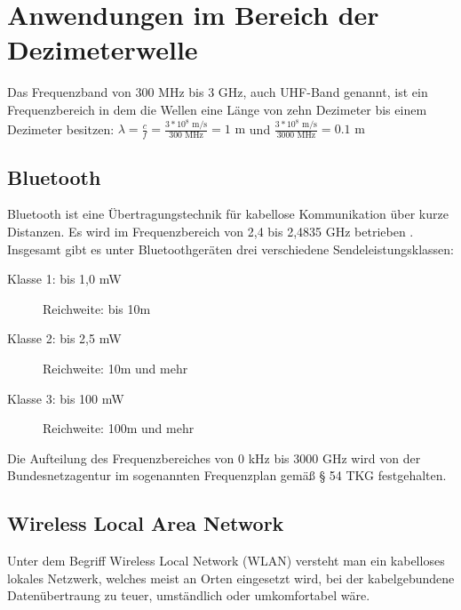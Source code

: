\section{Anwendungen im Bereich der Dezimeterwelle}
Das Frequenzband von 300 MHz bis 3 GHz, auch \ac{UHF}-Band genannt, ist ein Frequenzbereich in dem die Wellen eine Länge von zehn Dezimeter bis einem Dezimeter besitzen:
\( \lambda = \frac{c}{f} = \frac{3*10^8 \text{ m/s}}{300 \text{ MHz}} = 1\text{ m}\)
und
\( \frac{3*10^8 \text{ m/s}}{3000 \text{ MHz}} = 0.1\text{ m}\)






\subsection{Bluetooth}
Bluetooth ist eine Übertragungstechnik für kabellose Kommunikation über kurze Distanzen. Es wird im Frequenzbereich von 2,4 bis 2,4835 GHz betrieben \cite[Bundesamt für Strahlenschutz, S. 1]{bundesamt-strahlungsschutz:2012}. Insgesamt gibt es unter Bluetoothgeräten drei verschiedene Sendeleistungsklassen:
\begin{description}
	\item[Klasse 1: bis 1,0 mW] Reichweite: bis 10m 
	\item [Klasse 2: bis 2,5 mW] Reichweite: 10m und mehr
	\item [Klasse 3: bis 100 mW] Reichweite: 100m und mehr
\end{description}
Die Aufteilung des Frequenzbereiches von 0 kHz bis 3000 GHz wird von der Bundesnetzagentur im sogenannten Frequenzplan \cite[Bundesnetzagentur]{bundesnetzagentur-frequenzplan:2016} gemäß § 54 TKG festgehalten.





\subsection{Wireless Local Area Network}
Unter dem Begriff Wireless Local Network (WLAN) versteht man ein kabelloses lokales Netzwerk, welches meist an Orten eingesetzt wird, bei der kabelgebundene Datenübertraung zu teuer, umständlich oder umkomfortabel wäre.






